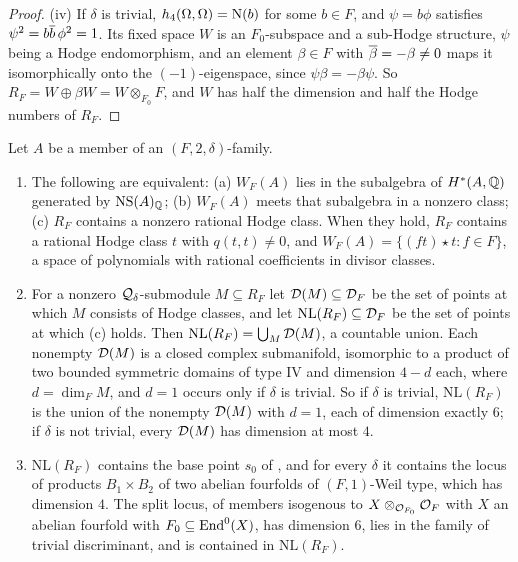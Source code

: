 \begin{proof}
(iv) If $\delta$ is trivial, $h_{4}(\Omega,\Omega)=\mathrm{N}(b)$ for some $b\in F$,
and $\psi=b\phi$ satisfies $\psi^{2}=b\overline{b}\,\phi^{2}=1$. Its fixed space
$W$ is an $F_{0}$-subspace and a sub-Hodge structure, $\psi$ being a Hodge
endomorphism, and an element $\beta\in F$ with $\overline{\beta}=-\beta\ne0$ maps it
isomorphically onto the $(-1)$-eigenspace, since $\psi\beta=-\beta\psi$. So
$R_{F}=W\oplus\beta W=W\otimes_{F_{0}}F$, and $W$ has half the dimension and
half the Hodge numbers of $R_{F}$.
\end{proof}

\begin{proposition}\label{prop:quarticnl}
Let $A$ be a member of an $(F,2,\delta)$-family.
\begin{enumerate}[label=\textup{(\roman*)},leftmargin=2.6em,itemsep=2pt]
\item The following are equivalent: \textup{(a)} $W_{F}(A)$ lies in the
  subalgebra of $H^{*}(A,\mathbb{Q})$ generated by $\mathrm{NS}(A)_{\mathbb{Q}}$; \textup{(b)}
  $W_{F}(A)$ meets that subalgebra in a nonzero class; \textup{(c)} $R_{F}$
  contains a nonzero rational Hodge class. When they hold, $R_{F}$ contains a
  rational Hodge class $t$ with $q(t,t)\ne0$, and
  $W_{F}(A)=\{(ft)\star t:f\in F\}$, a space of polynomials with rational
  coefficients in divisor classes.
\item For a nonzero $\mathcal{Q}_{\delta}$-submodule $M\subseteq R_{F}$ let
  $\mathcal{D}(M)\subseteq\mathcal{D}_{F}$ be the set of points at which $M$ consists of Hodge
  classes, and let $\mathrm{NL}(R_{F})\subseteq\mathcal{D}_{F}$ be the set of points at
  which \textup{(c)} holds. Then $\mathrm{NL}(R_{F})=\bigcup_{M}\mathcal{D}(M)$, a
  countable union. Each nonempty $\mathcal{D}(M)$ is a closed complex submanifold,
  isomorphic to a product of two bounded symmetric domains of type IV and
  dimension $4-d$ each, where $d=\dim_{F}M$, and $d=1$ occurs only if $\delta$ is
  trivial. So if $\delta$ is trivial, $\mathrm{NL}(R_{F})$ is the union of the
  nonempty $\mathcal{D}(M)$ with $d=1$, each of dimension exactly $6$; if $\delta$ is
  not trivial, every $\mathcal{D}(M)$ has dimension at most $4$.
\item $\mathrm{NL}(R_{F})$ contains the base point $s_{0}$ of
  , and for every $\delta$ it contains the locus of
  products $B_{1}\times B_{2}$ of two abelian fourfolds of $(F,1)$-Weil type,
  which has dimension $4$. The split locus, of members isogenous to
  $X\otimes_{\mathcal{O}_{F_{0}}}\mathcal{O}_{F}$ with $X$ an abelian fourfold with
  $F_{0}\subseteq\operatorname{End}^{0}(X)$, has dimension $6$, lies in the family of
  trivial discriminant, and is contained in $\mathrm{NL}(R_{F})$.
\end{enumerate}
\end{proposition}

